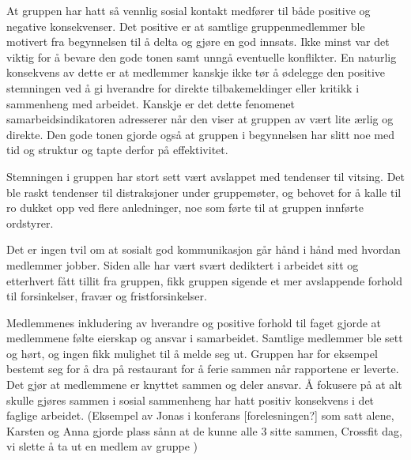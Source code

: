 At gruppen har hatt så vennlig sosial kontakt medfører til både positive og negative konsekvenser.
Det positive er at samtlige gruppenmedlemmer ble motivert fra begynnelsen til å delta og gjøre en god innsats.
Ikke minst var det viktig for å bevare den gode tonen samt unngå eventuelle konflikter.
En naturlig konsekvens av dette er at medlemmer kanskje ikke tør å ødelegge den positive stemningen ved å gi hverandre for direkte tilbakemeldinger eller kritikk i sammenheng med arbeidet.
Kanskje er det dette fenomenet samarbeidsindikatoren adresserer når den viser at gruppen av vært lite ærlig og direkte.
Den gode tonen gjorde også at gruppen i begynnelsen har slitt noe med tid og struktur og tapte derfor på effektivitet.

Stemningen i gruppen har stort sett vært avslappet med tendenser til vitsing.
Det ble raskt tendenser til distraksjoner under gruppemøter, og behovet for å kalle til ro dukket opp ved flere anledninger, noe som førte til at gruppen innførte ordstyrer.

Det er ingen tvil om at sosialt god kommunikasjon går hånd i hånd med hvordan medlemmer jobber.
Siden alle har vært svært dediktert i arbeidet sitt og etterhvert fått tillit fra gruppen, fikk gruppen sigende et mer avslappende forhold til forsinkelser, fravær og fristforsinkelser.

Medlemmenes inkludering av hverandre og positive forhold til faget gjorde at medlemmene følte eierskap og ansvar i samarbeidet.
Samtlige medlemmer ble sett og hørt, og ingen fikk mulighet til å melde seg ut.
Gruppen har for eksempel bestemt seg for å dra på restaurant for å ferie sammen når rapportene er leverte. 
Det gjør at medlemmene er knyttet sammen og deler ansvar.
Å fokusere på at alt skulle gjøres sammen i sosial sammenheng har hatt positiv konsekvens i det faglige arbeidet.
\iffalse
(Eksempel av Jonas i konferans [forelesningen?] som satt alene, Karsten og Anna gjorde plass sånn at de kunne alle 3 sitte sammen, Crossfit dag, vi slette å ta ut en medlem av gruppe )


